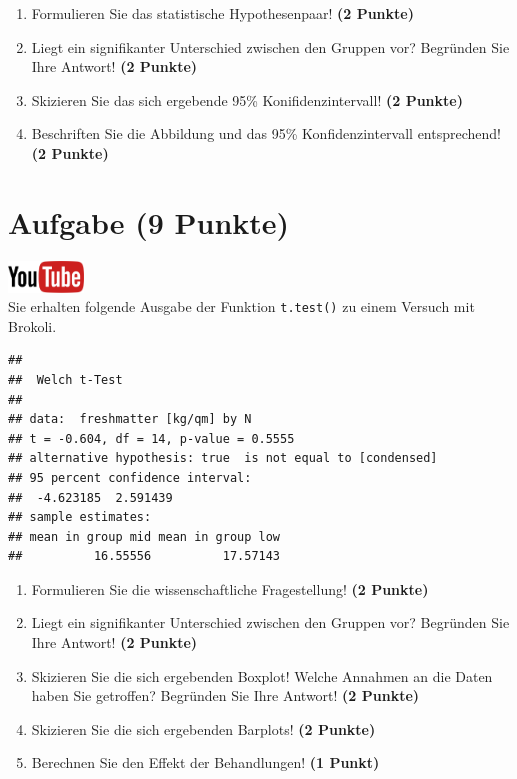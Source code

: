 \documentclass[a4paper, 9pt]{scrartcl}\usepackage[]{graphicx}\usepackage[]{xcolor}
\makeatletter
\newenvironment{kframe}{%
 \def\at@end@of@kframe{}%
 \ifinner\ifhmode%
  \def\at@end@of@kframe{\end{minipage}}%
  \begin{minipage}{\columnwidth}%
 \fi\fi%
 \def\FrameCommand##1{\hskip\@totalleftmargin \hskip-\fboxsep
 \colorbox{shadecolor}{##1}\hskip-\fboxsep
     \hskip-\linewidth \hskip-\@totalleftmargin \hskip\columnwidth}%
 \MakeFramed {\advance\hsize-\width
   \@totalleftmargin\z@ \linewidth\hsize
   \@setminipage}}%
 {\par\unskip\endMakeFramed%
 \at@end@of@kframe}
\newenvironment{knitrout}{}{} %
\makeatother
\begin{document}
\begin{enumerate}
  \item Formulieren Sie das statistische Hypothesenpaar! \textbf{(2
Punkte)}
\item Liegt ein signifikanter Unterschied zwischen den Gruppen vor?
  Begr{\"u}nden Sie Ihre Antwort! \textbf{(2 Punkte)}
\item Skizieren Sie das sich ergebende 95\% Konifidenzintervall! \textbf{(2 Punkte)}
\item Beschriften Sie die Abbildung und
  das 95\% Konfidenzintervall entsprechend! \textbf{(2 Punkte)}  
\end{enumerate} 
\clearpage

\section{Aufgabe \hfill (9 Punkte)}

\hfill\href{https://youtu.be/w62HJlbN28U}{\includegraphics[width =
  2cm]{img/youtube}}\\[1Ex]



Sie erhalten folgende \Rlogo Ausgabe der Funktion \texttt{t.test()} zu einem Versuch mit Brokoli.

\begin{knitrout}
\color{fgcolor}\begin{kframe}
\begin{verbatim}
## 
## 	Welch t-Test
## 
## data:  freshmatter [kg/qm] by N
## t = -0.604, df = 14, p-value = 0.5555
## alternative hypothesis: true  is not equal to [condensed]
## 95 percent confidence interval:
##  -4.623185  2.591439
## sample estimates:
## mean in group mid mean in group low 
##          16.55556          17.57143
\end{verbatim}
\end{kframe}
\end{knitrout}


\begin{enumerate}
  \item Formulieren Sie die wissenschaftliche Fragestellung! \textbf{(2
Punkte)}
\item Liegt ein signifikanter Unterschied zwischen den Gruppen vor?
  Begr{\"u}nden Sie Ihre Antwort! \textbf{(2 Punkte)}
\item Skizieren Sie die sich ergebenden Boxplot!
  Welche Annahmen an die Daten haben Sie getroffen? Begr{\"u}nden Sie Ihre
  Antwort! \textbf{(2 Punkte)} 
\item Skizieren Sie die sich ergebenden Barplots! \textbf{(2 Punkte)}
\item Berechnen Sie den Effekt der Behandlungen! \textbf{(1 Punkt)} 
\end{enumerate}
 
\end{document}
